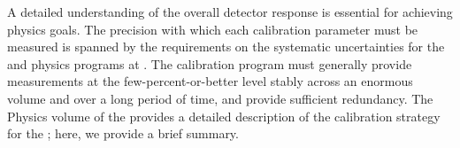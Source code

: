 


\label{sec:sp-calib-ov-intro}


A detailed understanding of the overall detector response is essential for achieving  physics goals. The precision with which each calibration parameter must be measured is spanned by the requirements on the %
systematic uncertainties for the  %
and  physics programs at . The calibration 
program 
must generally provide measurements at the few-percent-or-better 
level stably across an enormous volume and over a long period of time, and provide sufficient redundancy. The Physics volume of the  provides a detailed description of the calibration strategy for the  ; here, we provide a brief summary.

